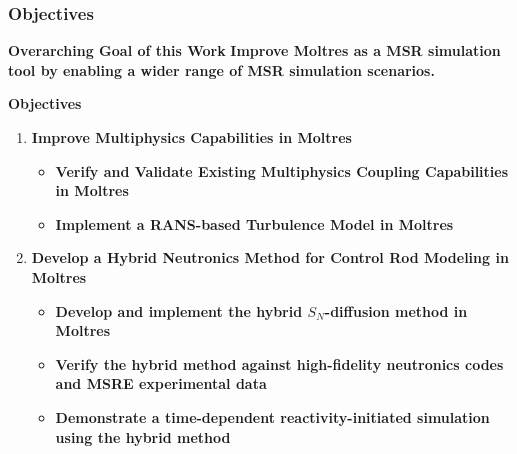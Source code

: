 \begin{frame}
  \frametitle{Objectives}
  \begin{block}{\textbf{Overarching Goal of this Work}}
    \textbf{Improve Moltres as a MSR simulation tool by enabling a wider range of MSR simulation
    scenarios.}
  \end{block}
  \begin{block}{\textbf{Objectives}}
    \begin{enumerate}
      \item \textbf{Improve Multiphysics Capabilities in Moltres}
      \begin{itemize}
        \item \textbf{Verify and Validate Existing Multiphysics Coupling Capabilities in Moltres}
        \item \textbf{Implement a RANS-based Turbulence Model in Moltres}
      \end{itemize}
      \item \textbf{Develop a Hybrid Neutronics Method for Control Rod Modeling in Moltres}
      \begin{itemize}
        \item \textbf{Develop and implement the hybrid $S_N$-diffusion method in Moltres}
        \item \textbf{Verify the hybrid method against high-fidelity neutronics codes and MSRE
          experimental data}
        \item \textbf{Demonstrate a time-dependent reactivity-initiated simulation using the hybrid
          method}
      \end{itemize}
    \end{enumerate}
  \end{block}
\end{frame}
